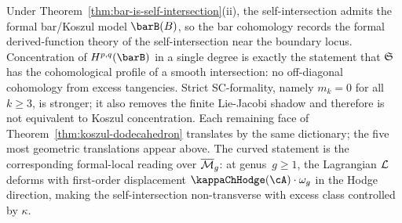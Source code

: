\begin{remark}[Evidence]
Under Theorem~\ref{thm:bar-is-self-intersection}(ii),
the self-intersection admits the formal bar/Koszul model $\barB(B)$,
so the bar cohomology records the formal derived-function theory of
the self-intersection near the boundary locus. Concentration of
$H^{p,q}(\barB)$ in a single degree is exactly the statement that
$\mathfrak{S}$ has the cohomological profile of a smooth intersection:
no off-diagonal cohomology from excess tangencies. Strict
SC-formality, namely $m_k=0$ for all $k\geq3$, is stronger; it also
removes the finite Lie-Jacobi shadow and therefore is not equivalent to
Koszul concentration.
Each remaining face of
Theorem~\ref{thm:koszul-dodecahedron} translates by the same
dictionary; the five most geometric translations appear above.
The curved statement is the corresponding formal-local reading
over $\overline{\mathcal M}_g$: at genus~$g \geq 1$, the Lagrangian
$\mathcal L$ deforms with first-order displacement $\kappaChHodge(\cA)\cdot
\omega_g$ in the Hodge direction, making the self-intersection
non-transverse with excess class controlled by $\kappa$.
\end{remark}


